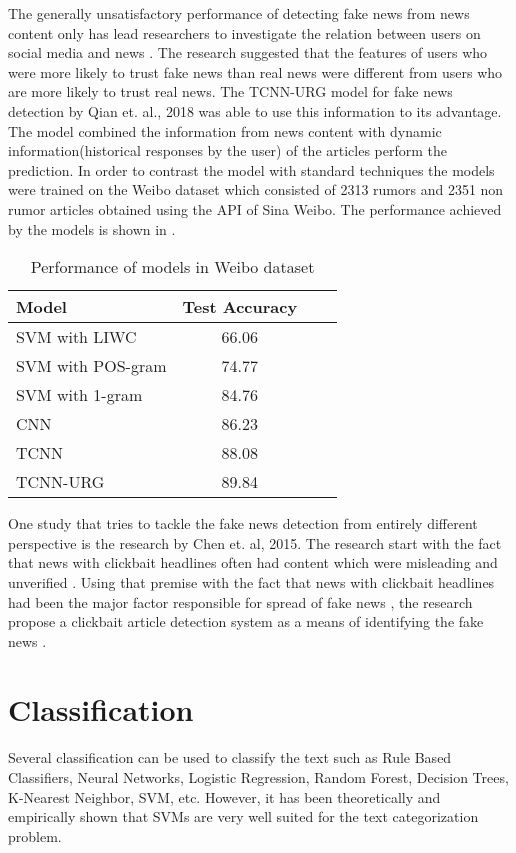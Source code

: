 The generally unsatisfactory performance of detecting fake news from news content only has lead researchers to investigate the relation between users on social media and news \cite{shu2018understanding}. The research suggested that the features of users who were more likely to trust fake news than real news were different from users who are more likely to trust real news. The TCNN-URG model for fake news detection by Qian et. al., 2018 was able to use this information to its advantage. The model combined the information from news content with dynamic information(historical responses by the user) of the articles perform the prediction. In order to contrast the model with standard techniques the models were trained on the Weibo dataset\cite{ma2016detecting} which consisted of 2313 rumors and 2351 non rumor articles obtained using the API of Sina Weibo. The performance achieved by the models is shown in  \cite{qian2018neural}.

\begin{table}[h]
\begin{center}
\caption{Performance of models in Weibo dataset}
\label{tbl:weibo_performance}
\begin{tabular}{@{}lccc@{}}
\toprule 
\rule[-1pt]{0pt}{14pt}Model&Test Accuracy\\
\midrule 
SVM with LIWC&66.06\\
SVM with POS-gram&74.77\\
SVM with 1-gram&84.76\\
CNN&86.23\\
TCNN&88.08\\
TCNN-URG&89.84\\
\bottomrule
\end{tabular}
\end{center}
\end{table}

One study that tries to tackle the fake news detection from entirely different perspective is the research by Chen et. al, 2015.  The research start with the fact that news with clickbait headlines often had content which were misleading and unverified \cite{silverman2016analysis}. Using that premise with the fact that news with clickbait headlines had been the major factor responsible for spread of fake news \cite{silverman2015lies}, the research propose a clickbait article detection system as a means of identifying the fake news \cite{chen2015misleading}.

\section{Classification}\label{classification}
Several classification can be used to classify the text such as Rule Based Classifiers, Neural Networks, Logistic Regression, Random Forest, Decision Trees, K-Nearest Neighbor, SVM\cite{cortes1995support}, etc. However, it has been theoretically and empirically shown that SVMs are very well suited for the text categorization problem\cite{joachims1998text}.


